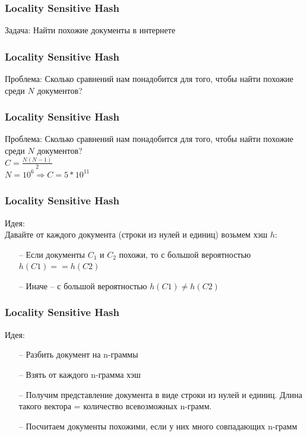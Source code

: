 \documentclass[12pt]{beamer}
\begin{document}
\begin{frame}\frametitle{Locality Sensitive Hash}
Задача: Найти похожие документы в интернете\\
\vspace{5mm}
\end{frame}

\begin{frame}\frametitle{Locality Sensitive Hash}
Проблема: Сколько сравнений нам понадобится  для того, чтобы найти похожие среди $N$ документов?\\
\vspace{5mm}
\end{frame}

\begin{frame}\frametitle{Locality Sensitive Hash}
Проблема: Сколько сравнений нам понадобится  для того, чтобы найти похожие среди $N$ документов?\\
\vspace{5mm}
$C = \frac{N(N-1)}{2}$\\
\vspace{5mm}
$N = 10^6 \Rightarrow C = 5*10^{11}$
\end{frame}

\begin{frame}\frametitle{Locality Sensitive Hash}
Идея:\\
Давайте от каждого документа (строки из нулей и единиц) возьмем хэш $h$:\\
\begin{itemize}
\item[--] Если документы $C_1$ и $C_2$ похожи, то с большой вероятностью $h(C1) == h(C2)$\\
\item[--] Иначе -- с большой вероятностью $h(C1) \neq h(C2)$
\end{itemize}
\end{frame}

\begin{frame}\frametitle{Locality Sensitive Hash}
Идея: \\
\begin{itemize}
\item[--] Разбить документ на n-граммы
\item[--] Взять от каждого n-грамма хэш
\item[--] Получим представление документа в виде строки из нулей и единиц. Длина такого вектора = количество всевозможных n-грамм.
\item[--] Посчитаем документы похожими, если у них много совпадающих n-грамм
\end{itemize}
\end{frame}
\end{document}
